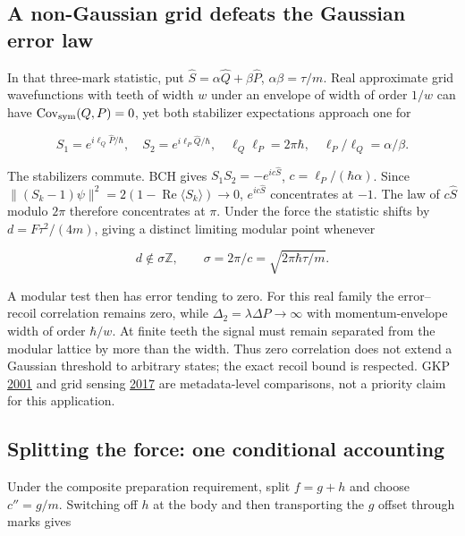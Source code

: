 \documentclass[11pt,a4paper]{article}
\begin{document}
\hypertarget{a-non-gaussian-grid-defeats-the-gaussian-error-law}{%
\subsection{A non-Gaussian grid defeats the Gaussian error
law}\label{a-non-gaussian-grid-defeats-the-gaussian-error-law}}

In that three-mark statistic, put \(\hat S=\alpha\hat Q+\beta\hat P\),
\(\alpha\beta=\tau/m\). Real approximate grid wavefunctions with teeth
of width \(w\) under an envelope of width of order \(1/w\) can have
\(\operatorname{Cov}_{\rm sym}(Q,P)=0\), yet both stabilizer
expectations approach one for

\[S_1=e^{i\ell_Q\hat P/\hbar},\quad S_2=e^{i\ell_P\hat Q/\hbar},
\quad\ell_Q\ell_P=2\pi\hbar,\quad\ell_P/\ell_Q=\alpha/\beta.\]

The stabilizers commute. BCH gives \(S_1S_2=-e^{ic\hat S}\),
\(c=\ell_P/(\hbar\alpha)\). Since
\(\|(S_k-1)\psi\|^2=2(1-\operatorname{Re}\langle S_k\rangle)\to0\),
\(e^{ic\hat S}\) concentrates at \(-1\). The law of \(c\hat S\) modulo
\(2\pi\) therefore concentrates at \(\pi\). Under the force the
statistic shifts by \(d=F\tau^2/(4m)\), giving a distinct limiting
modular point whenever

\[d\notin\sigma\mathbb Z,\qquad
\sigma=2\pi/c=\sqrt{2\pi\hbar\tau/m}.\]

A modular test then has error tending to zero. For this real family the
error--recoil correlation remains zero, while
\(\Delta_2=\lambda\Delta P\to\infty\) with momentum-envelope width of
order \(\hbar/w\). At finite teeth the signal must remain separated from
the modular lattice by more than the width. Thus zero correlation does
not extend a Gaussian threshold to arbitrary states; the exact recoil
bound is respected. GKP
\href{https://doi.org/10.1103/PhysRevA.64.012310}{2001} and grid sensing
\href{https://doi.org/10.1103/PhysRevA.95.012305}{2017} are
metadata-level comparisons, not a priority claim for this application.

\hypertarget{splitting-the-force-one-conditional-accounting}{%
\subsection{Splitting the force: one conditional
accounting}\label{splitting-the-force-one-conditional-accounting}}

Under the composite preparation requirement, split \(f=g+h\) and choose
\(c''=g/m\). Switching off \(h\) at the body and then transporting the
\(g\) offset through marks gives
\end{document}
